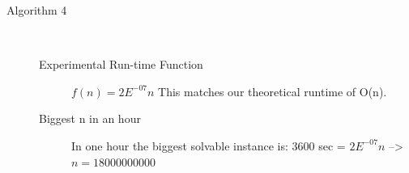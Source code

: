\documentclass[paper=a4, fontsize=11pt]{scrartcl} %
\numberwithin{equation}{section} %
\numberwithin{figure}{section} %
\numberwithin{table}{section} %
\begin{document}
\begin{description}
    \item[Algorithm 4] \hfill \\
    \begin{description}
        \item[Experimental Run-time Function]  $f(n) = 2E^{-07}n$ This matches our theoretical runtime of O(n). \\
        \item[Biggest n in an hour] In one hour the biggest solvable instance is: 3600 sec = $2E^{-07}n$ --> $n = 18000000000$ \\
    \end{description}
\end{description}
\end{document}
